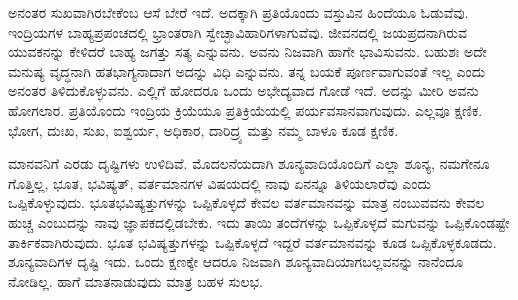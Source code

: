 ಅನಂತರ ಸುಖವಾಗಿರಬೇಕೆಂಬ ಆಸೆ ಬೇರೆ ಇದೆ. ಅದಕ್ಕಾಗಿ ಪ್ರತಿಯೊಂದು ವಸ್ತುವಿನ ಹಿಂದೆಯೂ ಓಡುವೆವು. ಇಂದ್ರಿಯಗಳ ಬಾಹ್ಯಪ್ರಪಂಚದಲ್ಲಿ ಭ್ರಾಂತರಾಗಿ ಸ್ವೇಚ್ಛಾವಿಹಾರಿಗಳಾಗುವೆವು. ಜೀವನದಲ್ಲಿ ಜಯಪ್ರದನಾಗಿರುವ ಯುವಕನನ್ನು ಕೇಳಿದರೆ ಬಾಹ್ಯ ಜಗತ್ತು ಸತ್ಯ ಎನ್ನುವನು. ಅವನು ನಿಜವಾಗಿ ಹಾಗೇ ಭಾವಿಸುವನು. ಬಹುಶಃ ಅದೇ ಮನುಷ್ಯ ವೃದ್ಧನಾಗಿ ಹತಭಾಗ್ಯನಾದಾಗ ಅದನ್ನು ವಿಧಿ ಎನ್ನುವನು. ತನ್ನ ಬಯಕೆ ಪೂರ್ಣವಾಗುವಂತೆ ಇಲ್ಲ ಎಂದು ಅನಂತರ ತಿಳಿದುಕೊಳ್ಳುವನು. ಎಲ್ಲಿಗೆ ಹೋದರೂ ಒಂದು ಅಭೇದ್ಯವಾದ ಗೋಡೆ ಇದೆ. ಅದನ್ನು ಮೀರಿ ಅವನು ಹೋಗಲಾರ. ಪ್ರತಿಯೊಂದು ಇಂದ್ರಿಯ ಕ್ರಿಯೆಯೂ ಪ್ರತಿಕ್ರಿಯೆಯಲ್ಲಿ ಪರ್ಯವಸಾನವಾಗುವುದು. ಎಲ್ಲವೂ ಕ್ಷಣಿಕ. ಭೋಗ, ದುಃಖ, ಸುಖ, ಐಶ್ವರ್ಯ, ಅಧಿಕಾರ, ದಾರಿದ್ರ್ಯ ಮತ್ತು ನಮ್ಮ ಬಾಳೂ ಕೂಡ ಕ್ಷಣಿಕ.

ಮಾನವನಿಗೆ ಎರಡು ದೃಷ್ಟಿಗಳು ಉಳಿದಿವೆ. ಮೊದಲನೆಯದಾಗಿ ಶೂನ್ಯವಾದಿ\break ಯೊಂದಿಗೆ ಎಲ್ಲಾ ಶೂನ್ಯ, ನಮಗೇನೂ ಗೊತ್ತಿಲ್ಲ, ಭೂತ, ಭವಿಷ್ಯತ್​, ವರ್ತಮಾನಗಳ ವಿಷಯದಲ್ಲಿ ನಾವು ಏನನ್ನೂ ತಿಳಿಯಲಾರೆವು ಎಂದು ಒಪ್ಪಿಕೊಳ್ಳುವುದು. ಭೂತಭವಿಷ್ಯತ್ತುಗಳನ್ನು ಒಪ್ಪಿಕೊಳ್ಳದೆ ಕೇವಲ ವರ್ತಮಾನವನ್ನು ಮಾತ್ರ ನಂಬುವವನು ಕೇವಲ ಹುಚ್ಚ ಎಂಬುದನ್ನು ನಾವು ಜ್ಞಾಪಕದಲ್ಲಿಡಬೇಕು. ಇದು ತಾಯಿ ತಂದೆಗಳನ್ನು ಒಪ್ಪಿಕೊಳ್ಳದೆ ಮಗುವನ್ನು ಒಪ್ಪಿಕೊಂಡಷ್ಟೇ ತಾರ್ಕಿಕವಾಗಿರುವುದು. ಭೂತ ಭವಿಷ್ಯತ್ತುಗಳನ್ನು ಒಪ್ಪಿಕೊಳ್ಳದೆ ಇದ್ದರೆ ವರ್ತಮಾನವನ್ನು ಕೂಡ ಒಪ್ಪಿಕೊಳ್ಳಕೂಡದು. ಶೂನ್ಯವಾದಿಗಳ ದೃಷ್ಟಿ ಇದು. ಒಂದು ಕ್ಷಣಕ್ಕೇ ಆದರೂ ನಿಜವಾಗಿ ಶೂನ್ಯವಾದಿಯಾಗಬಲ್ಲವನನ್ನು ನಾನೆಂದೂ ನೋಡಿಲ್ಲ. ಹಾಗೆ ಮಾತನಾಡುವುದು ಮಾತ್ರ ಬಹಳ ಸುಲಭ.

\vskip 0.2cm

